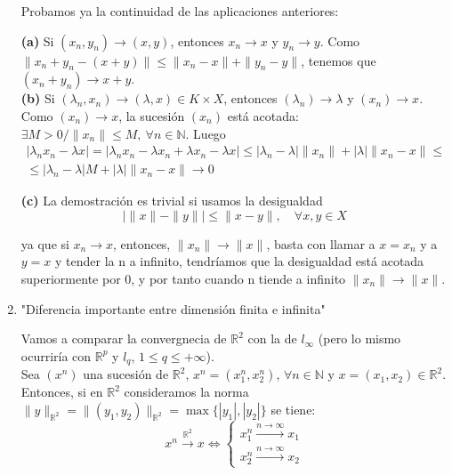 \documentclass{article}
\begin{document}
\begin{enumerate}
Probamos ya la continuidad de las aplicaciones anteriores:

\textbf{(a)} Si $(x_n,y_n)\rightarrow (x,y)$, entonces $x_n\rightarrow x$ y $y_n\rightarrow y$. Como $\|x_n+y_n-(x+y)\|\leq \|x_n-x\|+\|y_n-y\|$, tenemos que $(x_n+y_n)\rightarrow x+y$.\\

\textbf{(b)} Si $(\lambda_n,x_n)\rightarrow (\lambda,x)\in K\times X$, entonces $(\lambda_n)\rightarrow \lambda$ y $(x_n)\rightarrow x$. Como $(x_n)\rightarrow x$, la sucesión $(x_n)$ está acotada: $\exists M>0/\|x_n\|\leq M,\:\forall n\in \mathbb{N}$. Luego
\begin{gather*}
|\lambda_n x_n-\lambda x|=|\lambda_n x_n-\lambda x_n+\lambda x_n-\lambda x| \leq |\lambda_n-\lambda|\|x_n\|+|\lambda|\|x_n-x\|\leq \\
\leq |\lambda_n-\lambda|M+|\lambda|\|x_n-x\|\rightarrow 0
\end{gather*}

\textbf{(c)} La demostración es trivial si usamos la desigualdad
\begin{equation*}
|\|x\|-\|y\||\leq \|x-y\|,\quad \forall x,y\in X
\end{equation*}

ya que si $x_n\rightarrow x$, entonces, $\|x_n\|\rightarrow \|x\|$, basta con llamar a $x=x_n$ y a $y=x$ y tender la n a infinito, tendríamos que la desigualdad está acotada superiormente por 0, y por tanto cuando n tiende a infinito $\|x_n\|\rightarrow \|x\|$.


\item "Diferencia importante entre dimensión finita e infinita"

Vamos a comparar la convergnecia de $\mathbb{R}^2$ con la de $l_\infty$ (pero lo mismo ocurriría con $\mathbb{R}^p$ y $l_q$, $1\leq q\leq +\infty$).\\

Sea $(x^n)$ una sucesión de $\mathbb{R}^2$, $x^n=(x^n_1,x^n_2)$, $\forall n\in \mathbb{N}$ y $x=(x_1,x_2)\in \mathbb{R}^2$. Entonces, si en $\mathbb{R}^2$ consideramos la norma $\|y\|_{\mathbb{R}^2}=\|(y_1,y_2)\|_{\mathbb{R}^2}=\max\{|y_1|,|y_2|\}$ se tiene:
\begin{equation*}
x^n\xrightarrow{\mathbb{R}^2}x\Leftrightarrow \left\lbrace \begin{array}{c}
x_1^n\xrightarrow{n\to\infty} x_1\\
x_2^n\xrightarrow{n\to\infty} x_2
\end{array}\right.
\end{equation*}


\end{enumerate}
\end{document}
